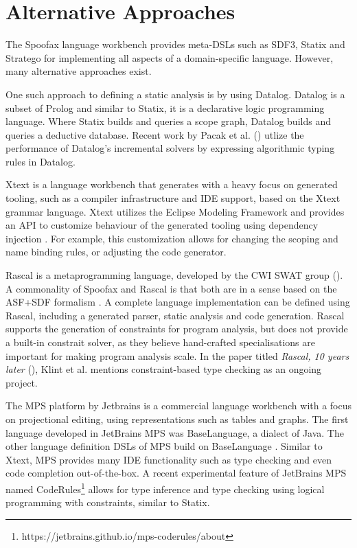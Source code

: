  \section{Alternative Approaches}

    The Spoofax language workbench provides meta-DSLs such as SDF3, Statix and Stratego for implementing all aspects of a domain-specific language. However, many alternative approaches exist.

    One such approach to defining a static analysis is by using Datalog. Datalog is a subset of Prolog and similar to Statix, it is a declarative logic programming language. Where Statix builds and queries a scope graph, Datalog builds and queries a deductive database. Recent work by Pacak et al. (\citeyear{PacakES20}) utlize the performance of Datalog's incremental solvers by expressing algorithmic typing rules in Datalog.

    Xtext \autocite{EfftingeVoelter2006} is a language workbench that generates with a heavy focus on generated tooling, such as a compiler infrastructure and IDE support, based on the Xtext grammar language. Xtext utilizes the Eclipse Modeling Framework \autocite{Steinberg2009EMF} and provides an API to customize behaviour of the generated tooling using dependency injection \autocite{eysholdt2010xtext}. For example, this customization allows for changing the scoping and name binding rules, or adjusting the code generator.

    Rascal is a metaprogramming language, developed by the CWI SWAT group (\citeyear{KlintSV09}). A commonality of Spoofax and Rascal is that both are in a sense based on the ASF+SDF formalism \autocite{Klint93}. A complete language implementation can be defined using Rascal, including a generated parser, static analysis and code generation. Rascal supports the generation of constraints for program analysis, but does not provide a built-in constrait solver, as they believe hand-crafted specialisations are important for making program analysis scale. In the paper titled \textit{Rascal, 10 years later} (\citeyear{KlintSV19}), Klint et al. mentions constraint-based type checking as an ongoing project.

    The MPS platform by Jetbrains \autocite{Dmitriev2004LanguageOP} is a commercial language workbench with a focus on projectional editing, using representations such as tables and graphs. The first language developed in JetBrains MPS was BaseLanguage, a dialect of Java. The other language definition DSLs of MPS build on BaseLanguage \autocite{PechSV13}. Similar to Xtext, MPS provides many IDE functionality such as type checking and even code completion out-of-the-box. A recent experimental feature of JetBrains MPS named CodeRules\footnote{https://jetbrains.github.io/mps-coderules/about} allows for type inference and type checking using logical programming with constraints, similar to Statix.
